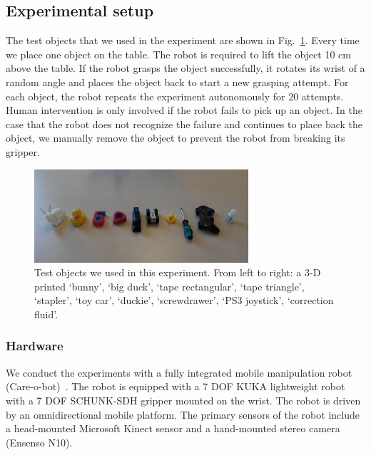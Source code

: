 \subsection{Experimental setup}
The test objects that we used in the experiment are shown in Fig.~\ref{fig:test_objects}. Every time we place one object on the table. The robot is required to lift the object 10 cm above the table. If the robot grasps the object successfully, it rotates its wrist of a random angle and places the object back to start a new grasping attempt. For each object, the robot repeats the experiment autonomously for 20 attempts. Human intervention is only involved if the robot fails to pick up an object. In the case that the robot does not recognize the failure and continues to place back the object,  we manually remove the object to prevent the robot from breaking its gripper.  

\begin{figure}[!htbp] 
\centering
\includegraphics[width=0.7\linewidth]
{figure/test_object.png}%
\caption{Test objects we used in this experiment. From left to right: a 3-D printed `bunny', `big duck', `tape rectangular', `tape triangle', `stapler', `toy car', `duckie', `screwdrawer', `PS3 joystick', `correction fluid'. }
\label{fig:test_objects}
\end{figure}	
   
\subsubsection{Hardware}
We conduct the experiments with a fully integrated mobile manipulation robot (Care-o-bot)~\cite{careobot}. The robot is equipped with a 7 DOF KUKA lightweight robot with a 7 DOF SCHUNK-SDH gripper mounted on the wrist. The robot is driven by an omnidirectional mobile platform. The primary sensors of the robot include a head-mounted Microsoft Kinect sensor and a hand-mounted stereo camera (Ensenso N10). 

